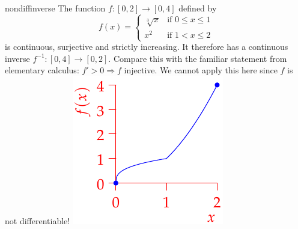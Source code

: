 \begin{example}[lower separated=false, sidebyside, sidebyside align=top seam, sidebyside gap=0pt, righthand width=0.27\linewidth]{}{nondiffinverse}
	The function $f:[0,2]\to[0,4]$ defined by
	\[
		f(x)=
		\begin{cases}
			\sqrt[3]{x}&\text{if }0\le x\le 1\\
			x^2&\text{if }1<x\le 2
		\end{cases}
	\]
	is continuous, surjective and strictly increasing. It therefore has a continuous inverse $f^{-1}:[0,4]\to[0,2]$. Compare this with the familiar statement from elementary calculus: $f'>0\Longrightarrow f$ injective. We cannot apply this here since $f$ is not differentiable!
	\tcblower
	\flushright\includegraphics[scale=0.95]{inversecont}
\end{example}


